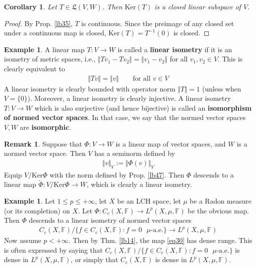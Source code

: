 \documentclass[12pt,b5paper,notitlepage]{article}
\theoremstyle{definition}
\newtheorem{eg}[df]{Example}
\newtheorem{rem}[df]{Remark}
\theoremstyle{plain}
\newtheorem{co}[df]{Corollary}
\newcommand{\fk}{\mathfrak}
\newcommand{\wtd}{\widetilde}
\newcommand{\Ker}{\mathrm{Ker}}
\newcommand{\Fbb}{\mathbb F}
\numberwithin{equation}{section}
\begin{document}
\begin{co}\label{lb147}
Let $T\in\fk L(V,W)$. Then $\Ker(T)$ is a closed linear subspace of $V$.
\end{co}

\begin{proof}
By Prop. \ref{lb35}, $T$ is continuous. Since the preimage of any closed set under a continuous map is closed, $\Ker(T)=T^{-1}(0)$ is closed.
\end{proof}



\begin{eg}
A linear map $T:V\rightarrow W$ is called a \textbf{linear isometry} if it is an isometry of metric spaces, i.e., $\Vert Tv_1-Tv_2\Vert=\Vert v_1-v_2\Vert$ for all $v_1,v_2\in V$. This is clearly equivalent to
\begin{align*}
\Vert Tv\Vert=\Vert v\Vert\qquad\text{for all }v\in V
\end{align*}
A linear isometry is clearly bounded with operator norm $\Vert T\Vert=1$ (unless when $V=\{0\}$). Moreover, a linear isometry is clearly injective. A linear isometry $T:V\rightarrow W$ which is also surjective (and hence bijective) is called an \textbf{isomorphism of normed vector spaces}. In that case, we say that the normed vector spaces $V,W$ are \textbf{isomorphic}. 
\end{eg}


\begin{rem}
Suppose that $\Phi:V\rightarrow W$ is a linear map of vector spaces, and $W$ is a normed vector space. Then $V$ has a seminorm defined by
\begin{align*}
\Vert v\Vert_V:=\Vert \Phi(v)\Vert_V
\end{align*}
Equip $V/\Ker\Phi$ with the norm defined by Prop. \ref{lb47}. Then $\Phi$ descends to a linear map $\wtd\Phi:V/\Ker\Phi\rightarrow W$, which is clearly a linear isometry. 
\end{rem}

\begin{eg}\label{lb48}
Let $1\leq p\leq+\infty$, let $X$ be an LCH space, let $\mu$ be a Radon measure (or its completion) on $X$. Let $\Phi:C_c(X,\Fbb)\rightarrow L^p(X,\mu,\Fbb)$ be the obvious map. Then $\Phi$ descends to a linear isometry of normed vector spaces
\begin{gather}\label{eq30}
C_c(X,\Fbb)\big/\big\{f\in C_c(X,\Fbb):f=0\text{ $\mu$-a.e.}\big\}\longrightarrow L^p(X,\mu,\Fbb)
\end{gather}
Now assume $p<+\infty$. Then by Thm. \ref{lb14}, the map \eqref{eq30} has dense range. This is often expressed by saying that $C_c(X,\Fbb)\big/\big\{f\in C_c(X,\Fbb):f=0\text{ $\mu$-a.e.}\big\}$ is dense in $L^p(X,\mu,\Fbb)$, or simply that $C_c(X,\Fbb)$ is dense in $L^p(X,\mu,\Fbb)$.
\end{eg}
\end{document}
